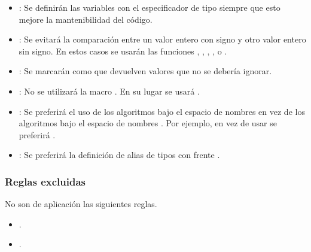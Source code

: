 \begin{itemize}
\item {}:
Se definirán las variables con el especificador de tipo  siempre
que esto mejore la mantenibilidad del código.

\item {}:
Se evitará la comparación entre un valor entero con signo y otro valor entero
sin signo. En estos casos se usarán las funciones ,
, , ,
 o .

\item {}:
Se marcarán como \cppkey{[[nodiscard]]} que devuelven valores que no se debería
ignorar.

\item {}:
No se utilizará la macro .
En su lugar se usará .

\item {}:
Se preferirá el uso de los algoritmos bajo el espacio de nombres
 en vez de los algoritmos bajo el espacio de nombres
. Por ejemplo, en vez de usar 
se preferirá .

\item {}:
Se preferirá la definición de alias de tipos con  frente
.

\end{itemize}

\subsubsection{Reglas excluidas}

No son de aplicación las siguientes reglas.

\begin{itemize}

\item {}.
\item {}.

\end{itemize}

